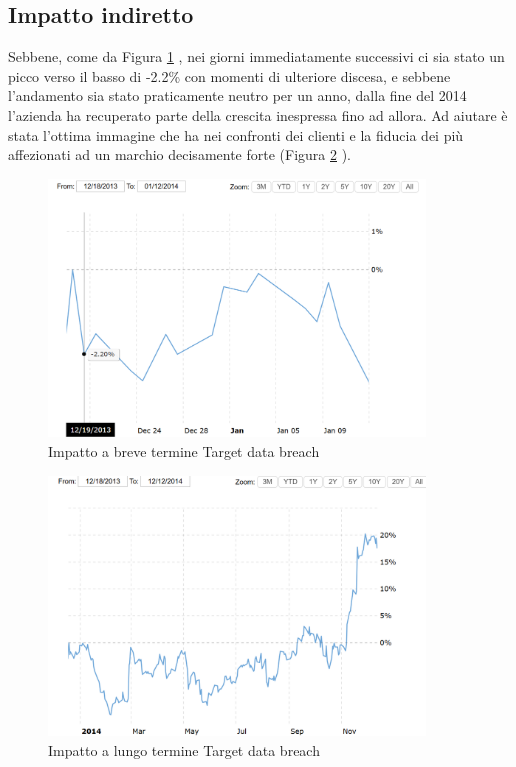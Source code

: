 \documentclass[12pt,a4paper,twoside]{report}
\begin{document}
\subsection{Impatto indiretto}
Sebbene, come da Figura \ref{fig:tgt1} \cite{macrotrends_target}, nei giorni immediatamente successivi ci sia stato un picco verso il basso di -2.2\% con momenti di ulteriore discesa, e sebbene l'andamento sia stato praticamente neutro per un anno, dalla fine del 2014 l'azienda ha recuperato parte della crescita inespressa fino ad allora. Ad aiutare \`e stata l'ottima immagine che ha nei confronti dei clienti e la fiducia dei pi\`u affezionati ad un marchio decisamente forte (Figura \ref{fig:tgt2} \cite{macrotrends_target}).\\
\begin{figure}[H] 
\begin{center} 
\includegraphics[width=10cm]{figures/target_short.png} 
\caption[Grafico Target short]{Impatto a breve termine Target data breach}\label{fig:tgt1}
\end{center}
\end{figure}
\begin{figure}[H]
\begin{center} 
\includegraphics[width=10cm]{figures/target_long.png} 
\caption[Grafico Target long]{Impatto a lungo termine Target data breach}\label{fig:tgt2}
\end{center}
\end{figure}
\end{document}
